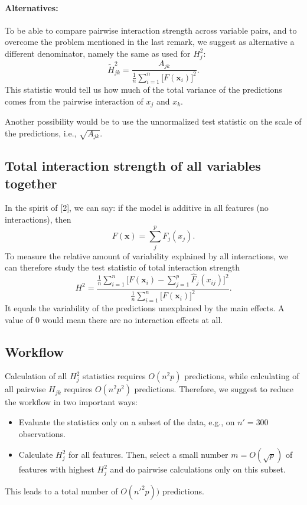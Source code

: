 \documentclass[]{article}
\begin{document}
\paragraph{Alternatives:} To be able to compare pairwise interaction strength across variable pairs, and to overcome the problem mentioned in the last remark, we suggest as alternative a different denominator, namely the same as used for $H^2_j$:
$$
  \tilde H^2_{jk} = \frac{A_{jk}}{\frac{1}{n} \sum_{i = 1}^n\big[F(\mathbf{x}_i)\big]^2}.
$$
This statistic would tell us how much of the total variance of the predictions comes from the pairwise interaction of $x_j$ and $x_k$.

Another possibility would be to use the unnormalized test statistic on the scale of the predictions, i.e., $\sqrt{A_{jk}}$.

\subsection{Total interaction strength of all variables together}
In the spirit of [2], we can say: if the model is additive in all features (no interactions), then
$$
	F(\mathbf{x}) = \sum_{j}^{p} F_j(x_j).
$$
To measure the relative amount of variability explained by all interactions, we can therefore study the test statistic of total interaction strength
$$
  H^2 = \frac{\frac{1}{n} \sum_{i = 1}^n \big[F(\mathbf{x}_i) - \sum_{j = 1}^p\hat F_j(x_{ij})\big]^2}{\frac{1}{n} \sum_{i = 1}^n\big[F(\mathbf{x}_i)\big]^2}.
$$
It equals the variability of the predictions unexplained by the main effects. A value of 0 would mean there are no interaction effects at all.

\subsection{Workflow}
Calculation of all $H_j^2$ statistics requires $O(n^2p)$ predictions, while calculating of all pairwise $H_{jk}$ requires $O(n^2 p^2)$ predictions. Therefore, we suggest to reduce the workflow in two important ways:
\begin{itemize}
\item Evaluate the statistics only on a subset of the data, e.g., on $n' = 300$ observations.
\item Calculate $H_j^2$ for all features. Then, select a small number $m = O(\sqrt{p})$ of features with highest $H^2_j$ and do pairwise calculations only on this subset.
\end{itemize}
This leads to a total number of $O(n'^2 p))$ predictions.
\end{document}

